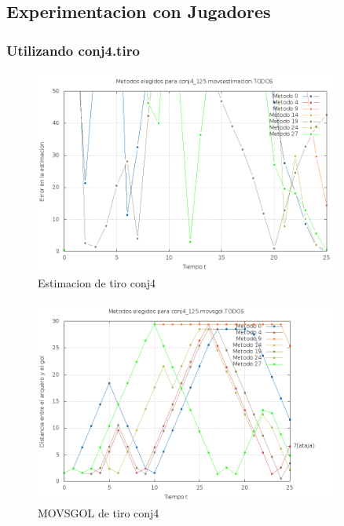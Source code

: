 \subsection{Experimentacion con Jugadores}


\subsubsection{Utilizando conj4.tiro}

\begin{figure}[H]
\begin{center}
\includegraphics[width=0.9\textwidth]{img/conj4_125_movsestimacion_TODOS_elegidos.png}
     \caption{Estimacion de tiro conj4}
\end{center}
\end{figure}

\begin{figure}[H]
\begin{center}
\includegraphics[width=0.9\textwidth]{img/conj4_125_movsgol_TODOS_elegidos.png}
     \caption{MOVSGOL de tiro conj4}
\end{center}
\end{figure}


